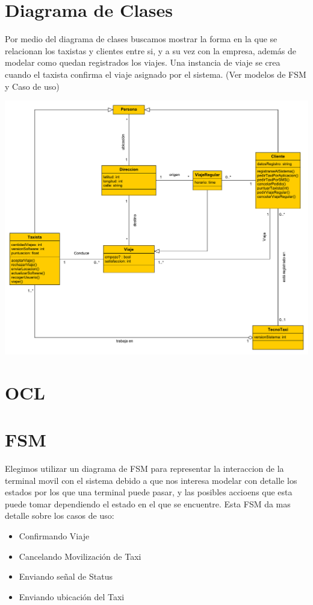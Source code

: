 \documentclass[a4paper]{article}
\begin{document}
\section{Diagrama de Clases}
Por medio del diagrama de clases buscamos mostrar la forma en la que se relacionan los taxistas y clientes entre si, y a su vez con la empresa, adem\'as
de modelar como quedan registrados los viajes. Una instancia de viaje se crea cuando el taxista confirma el viaje asignado por el sistema. (Ver modelos de FSM y Caso de uso)


\centering
\includegraphics[scale=.38]{diag_Clases.pdf}

\section{OCL}

\section{FSM}

Elegimos utilizar un diagrama de FSM para representar la interaccion de la terminal movil con el sistema debido a que nos interesa modelar
con detalle los estados por los que una terminal puede pasar, y las posibles accioens que esta puede tomar dependiendo el estado en el que se encuentre.
Esta FSM da mas detalle sobre los casos de uso: 
\begin{itemize}
\item Confirmando Viaje
\item Cancelando Movilizaci\'on de Taxi
\item Enviando se\~nal de Status
\item Enviando ubicaci\'on del Taxi
\end{itemize}
\end{document}
